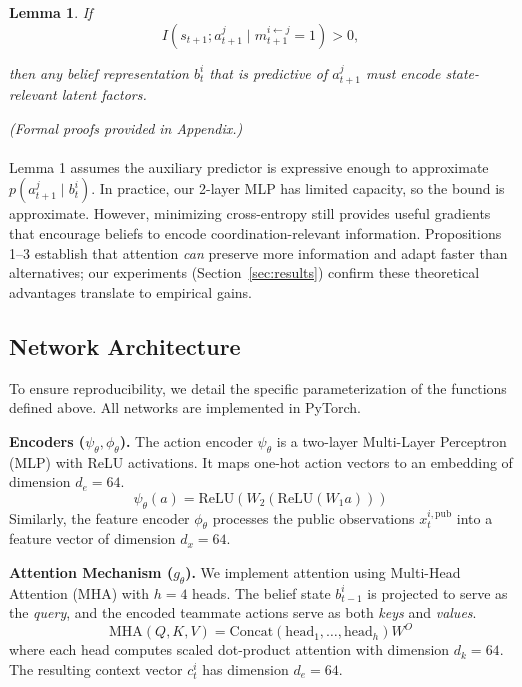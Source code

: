 \documentclass{article}
\theoremstyle{plain}
\newtheorem{lemma}[theorem]{Lemma}
\theoremstyle{definition}
\theoremstyle{remark}
\begin{document}
\begin{lemma}
If
\begin{equation}
  I\!\left( s_{t+1} ; a_{t+1}^j \mid m_{t+1}^{i \leftarrow j} = 1 \right) > 0,
\end{equation}

then any belief representation $b_t^i$ that is predictive of $a_{t+1}^j$ must encode state-relevant latent factors.
\end{lemma}

\textit{(Formal proofs provided in Appendix.)}

\paragraph{}
Lemma 1 assumes the auxiliary predictor is expressive enough to approximate $p(a_{t+1}^j \mid b_t^i)$. In practice, our 2-layer MLP has limited capacity, so the bound is approximate. However, minimizing cross-entropy still provides useful gradients that encourage beliefs to encode coordination-relevant information. Propositions 1--3 establish that attention \emph{can} preserve more information and adapt faster than alternatives; our experiments (Section~\ref{sec:results}) confirm these theoretical advantages translate to empirical gains.

\subsection{Network Architecture}
\label{sec:architecture}

To ensure reproducibility, we detail the specific parameterization of the functions defined above. All networks are implemented in PyTorch.

\textbf{Encoders ($\psi_\theta, \phi_\theta$).}
The action encoder $\psi_\theta$ is a two-layer Multi-Layer Perceptron (MLP) with ReLU activations. It maps one-hot action vectors to an embedding of dimension $d_e = 64$.
\[ \psi_\theta(a) = \mathrm{ReLU}(W_2 (\mathrm{ReLU}(W_1 a))) \]
Similarly, the feature encoder $\phi_\theta$ processes the public observations $x_t^{i,\mathrm{pub}}$ into a feature vector of dimension $d_x = 64$.

\textbf{Attention Mechanism ($g_\theta$).}
We implement attention using Multi-Head Attention (MHA) with $h=4$ heads. The belief state $b_{t-1}^i$ is projected to serve as the \textit{query}, and the encoded teammate actions serve as both \textit{keys} and \textit{values}.
\[ \mathrm{MHA}(Q, K, V) = \mathrm{Concat}(\mathrm{head}_1, \ldots, \mathrm{head}_h)W^O \]
where each head computes scaled dot-product attention with dimension $d_k = 64$. The resulting context vector $c_t^i$ has dimension $d_e = 64$.
\end{document}
